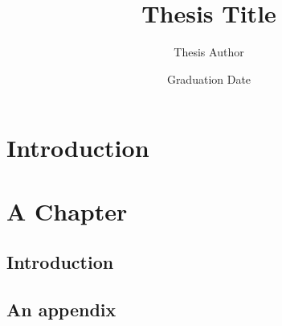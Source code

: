 \documentclass{ucetd}
\title{Thesis Title}
\author{Thesis Author}
\date{Graduation Date}
\begin{document}
\maketitle

\makecopyright
\makededication
\makeepigraph


\tableofcontents
\listoffigures
\listoftables

\acknowledgments

\abstract

\mainmatter

\chapter{Introduction}

\chapter{A Chapter}
\section{Introduction}

\begin{appendices}

\chapter{An appendix}

\end{appendices}




%
%
\end{document}
